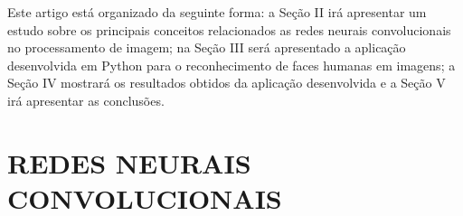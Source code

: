 \documentclass[conference]{IEEEtran}
\begin{document}
		Este artigo está organizado da seguinte forma: a Seção II irá apresentar um estudo sobre os principais conceitos relacionados as redes neurais convolucionais no processamento de imagem; na Seção III será apresentado a aplicação desenvolvida em Python para o reconhecimento de faces humanas em imagens; a Seção IV mostrará os resultados obtidos da aplicação desenvolvida e a Seção V irá apresentar as conclusões.   
		
	 \section{REDES NEURAIS CONVOLUCIONAIS}
	
		
\end{document}
